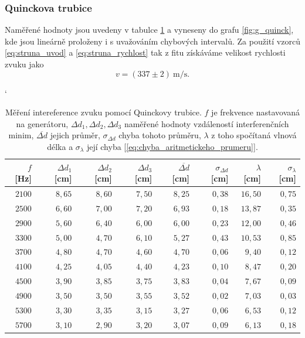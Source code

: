 \documentclass[english]{article}
\newcommand{\unit}[1]{\mathrm{#1}}
\begin{document}
	\subsubsection{Quinckova trubice}
		Naměřené hodnoty jsou uvedeny v tabulce \ref{tab:quinck} a vyneseny do grafu \ref{fig:g_quinck}, kde jsou lineárně proloženy i s uvažováním chybových intervalů. Za použití vzorců \ref{eq:struna_uvod} a \ref{eq:struna_rychlost} tak z fitu získáváme velikost rychlosti zvuku jako 
			\begin{equation}
			v = (337 \pm 2)\ \unit{m/s}.
			\label{eq:quinck_vysledky}
			\end{equation}							
		
		\begin{table}[h]
		\catcode` %
		\begin{center}
		\begin{tabular}{|r|r|r|r|r|r|r|r|}
		\hline
			$f$ [Hz]  &  $\Delta d_1$ [cm]  &  $\Delta d_2$ [cm]  &  $\Delta d_3$ [cm]  &  $\overline{\Delta d}$ [cm]  &  $\sigma_{\Delta d}$ [cm]  &  $\lambda$ [cm]  &  $\sigma_{\lambda}$ [cm]   \\\hline
			    $2100$  &  $8,65$  &  $8,60$  &  $7,50$  &  $8,25$  &  $0,38$  &  $16,50$  &  $0,75$   \\\hline
			    $2500$  &  $6,60$  &  $7,00$  &  $7,20$  &  $6,93$  &  $0,18$  &  $13,87$  &  $0,35$   \\\hline
			    $2900$  &  $5,60$  &  $6,40$  &  $6,00$  &  $6,00$  &  $0,23$  &  $12,00$  &  $0,46$   \\\hline
			    $3300$  &  $5,00$  &  $4,70$  &  $6,10$  &  $5,27$  &  $0,43$  &  $10,53$  &  $0,85$   \\\hline
			    $3700$  &  $4,80$  &  $4,70$  &  $4,60$  &  $4,70$  &  $0,06$  &  $9,40$  &  $0,12$   \\\hline
			    $4100$  &  $4,25$  &  $4,05$  &  $4,40$  &  $4,23$  &  $0,10$  &  $8,47$  &  $0,20$   \\\hline
			    $4500$  &  $3,90$  &  $3,85$  &  $3,75$  &  $3,83$  &  $0,04$  &  $7,67$  &  $0,09$   \\\hline
			    $4900$  &  $3,50$  &  $3,50$  &  $3,55$  &  $3,52$  &  $0,02$  &  $7,03$  &  $0,03$   \\\hline
			    $5300$  &  $3,30$  &  $3,35$  &  $3,15$  &  $3,27$  &  $0,06$  &  $6,53$  &  $0,12$   \\\hline
			    $5700$  &  $3,10$  &  $2,90$  &  $3,20$  &  $3,07$  &  $0,09$  &  $6,13$  &  $0,18$   \\\hline
		\end{tabular}
		\caption{Měření intereference zvuku pomocí Quinckovy trubice. $f$ je frekvence nastavovaná na generátoru, $\Delta d_1, \Delta d_2, \Delta d_3$ naměřené hodnoty vzdáleností interferenčních minim, $\overline{\Delta d}$ jejich průměr, $\sigma_{\Delta d}$ chyba tohoto průměru, $\lambda$ z toho spočítaná vlnová délka a $\sigma_\lambda$ její chyba [\ref{eq:chyba_aritmetickeho_prumeru}].}
		\label{tab:quinck}
		\end{center}
		\end{table}	
		
\end{document}
